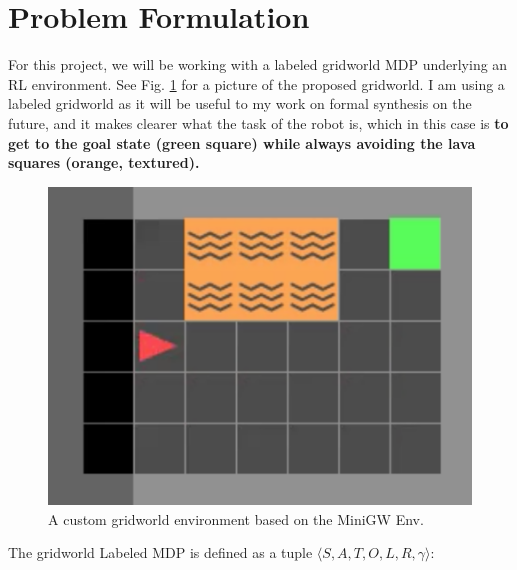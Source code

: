 \section{Problem Formulation}

For this project, we will be working with a labeled gridworld MDP underlying an RL environment. See Fig. \ref{fig: gw_env} for a picture of the proposed gridworld. I am using a labeled gridworld as it will be useful to my work on formal synthesis on the future, and it makes clearer what the task of the robot is, which in this case is \textbf{to get to the goal state (green square) while always avoiding the lava squares (orange, textured).}

\begin{figure}[htbp]
\centerline{\includegraphics[width=\linewidth]{Figures/gw_env.png}}
\caption{A custom gridworld environment based on the MiniGW Env. \cite{gym_minigrid}}
\label{fig: gw_env}
\end{figure}

The gridworld Labeled MDP is defined as a tuple \(\langle S, A, T, O, L, R, \gamma\rangle:\)\cite{DMU_Book}

